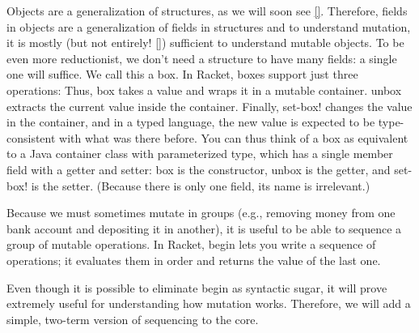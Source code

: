 
Objects are a generalization of structures, as we will soon see \ref{}.
Therefore, fields in objects are a generalization of fields in structures and to
understand mutation, it is mostly (but not entirely! \ref{}) sufficient to
understand mutable objects. To be even more reductionist, we don’t need a
structure to have many fields: a single one will suffice. We call this a box. In
Racket, boxes support just three operations:
Thus, box takes a value and wraps it in a mutable container. unbox extracts the
current value inside the container. Finally, set-box! changes the value in the
container, and in a typed language, the new value is expected to be
type-consistent with what was there before. You can thus think of a box as
equivalent to a Java container class with parameterized type, which has a single
member field with a getter and setter: box is the constructor, unbox is the
getter, and set-box! is the setter. (Because there is only one field, its name
is irrelevant.)

Because we must sometimes mutate in groups (e.g., removing money from one bank
account and depositing it in another), it is useful to be able to sequence a
group of mutable operations. In Racket, begin lets you write a sequence of
operations; it evaluates them in order and returns the value of the last one.


Even though it is possible to eliminate begin as syntactic sugar, it will prove
extremely useful for understanding how mutation works. Therefore, we will add a
simple, two-term version of sequencing to the core.
